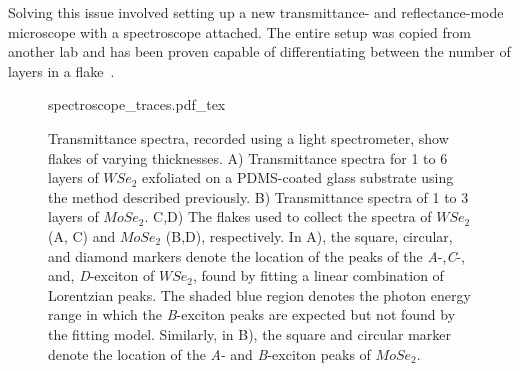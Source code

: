 Solving this issue involved setting up a new transmittance- and reflectance-mode microscope with a spectroscope attached. The entire setup was copied from another lab and has been proven capable of differentiating between the number of layers in a flake~\cite{frisendaMicroreflectanceTransmittanceSpectroscopy2017,niuThicknessDependentDifferentialReflectance2018}.

\begin{figure}[h!]
	\centering
	\def\svgwidth{1\linewidth}
	{spectroscope_traces.pdf_tex}
	\caption{Transmittance spectra, recorded using a light spectrometer, show flakes of varying thicknesses. A) Transmittance spectra for 1 to 6 layers of $WSe_2$ exfoliated on a PDMS-coated glass substrate using the method described previously. 
    B) Transmittance spectra of 1 to 3 layers of $MoSe_2$.
    C,D) The flakes used to collect the spectra of $WSe_2$ (A, C) and $MoSe_2$ (B,D), respectively.
    In A), the square, circular, and diamond markers denote the location of the peaks of the \textit{A}-,\textit{C}-, and, \textit{D}-exciton of $WSe_2$, found by fitting a linear combination of Lorentzian peaks. The shaded blue region denotes the photon energy range in which the \textit{B}-exciton peaks are expected but not found by the fitting model.
    Similarly, in B), the square and circular marker denote the location of the \textit{A}- and \textit{B}-exciton peaks of $MoSe_2$.}
	\label{fig:spectroscope_traces}
\end{figure}


